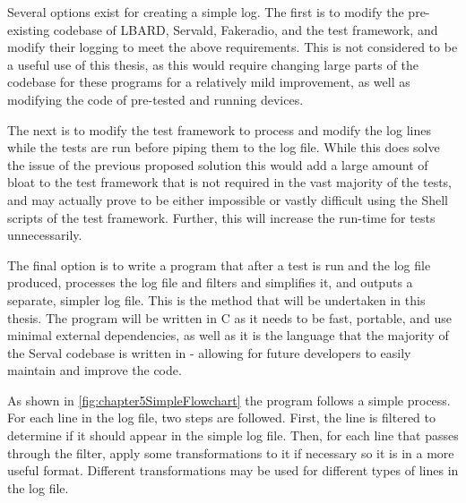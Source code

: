 Several options exist for creating a simple log.
The first is to modify the pre-existing codebase of LBARD, Servald, Fakeradio, and the test framework, and modify their logging to meet the above requirements.
This is not considered to be a useful use of this thesis, as this would require changing large parts of the codebase for these programs for a relatively mild improvement, as well as modifying the code of pre-tested and running devices.

The next is to modify the test framework to process and modify the log lines while the tests are run before piping them to the log file.
While this does solve the issue of the previous proposed solution this would add a large amount of bloat to the test framework that is not required in the vast majority of the tests, and may actually prove to be either impossible or vastly difficult using the Shell scripts of the test framework.
Further, this will increase the run-time for tests unnecessarily.

The final option is to write a program that after a test is run and the log file produced, processes the log file and filters and simplifies it, and outputs a separate, simpler log file. 
This is the method that will be undertaken in this thesis. 
The program will be written in C as it needs to be fast, portable, and use minimal external dependencies, as well as it is the language that the majority of the Serval codebase is written in - allowing for future developers to easily maintain and improve the code.

As shown in \figurename{ \ref{fig:chapter5SimpleFlowchart}} the program follows a simple process.
For each line in the log file, two steps are followed.
First, the line is filtered to determine if it should appear in the simple log file. 
Then, for each line that passes through the filter, apply some transformations to it if necessary so it is in a more useful format.
Different transformations may be used for different types of lines in the log file.


